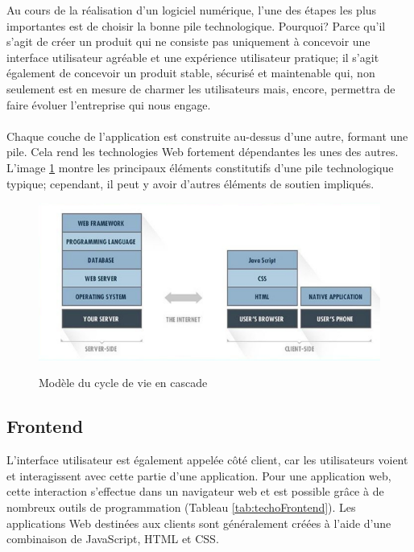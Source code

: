 Au cours de la réalisation d'un logiciel numérique,
        l'une des étapes les plus importantes est de choisir la bonne pile technologique. 
        Pourquoi? Parce qu'il s'agit de créer un produit qui ne consiste pas uniquement
        à concevoir une interface utilisateur agréable et une expérience utilisateur 
        pratique; il s'agit également de concevoir un produit stable, sécurisé et 
        maintenable qui, non seulement est en mesure de charmer les utilisateurs mais, encore,
        permettra de faire évoluer l'entreprise qui nous engage.
        \paragraph{}
        Chaque couche de l'application est construite au-dessus d'une autre, 
        formant une pile. Cela rend les technologies Web fortement dépendantes 
        les unes des autres. L'image \ref{fig:pile} montre les principaux éléments constitutifs 
        d'une pile technologique typique; cependant, il peut y avoir d'autres éléments de 
        soutien impliqués.
        \begin{figure}[t]
                \centering
                \includegraphics[scale=0.5]{images/Implementation/pile.png}
                \caption{Modèle du cycle de vie en cascade }\cite{Bulatovych}
                \label{fig:pile}
        \end{figure}
        \subsection{Frontend}
        L'interface utilisateur est également appelée côté client, car les utilisateurs voient et interagissent 
        avec cette partie d'une application. Pour une application web, cette interaction s'effectue 
        dans un navigateur web et est possible grâce à de nombreux outils de programmation (Tableau \ref{tab:techoFrontend}). 
        Les applications Web destinées aux clients sont généralement créées à l'aide d'une combinaison 
        de JavaScript, HTML et CSS.
